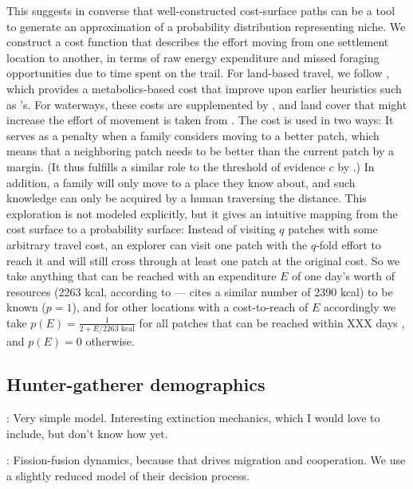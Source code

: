 \documentclass[a4paper,12pt]{scrartcl}
\begin{document}
This suggests in converse that well-constructed cost-surface paths can be a tool
to generate an approximation of a probability distribution representing niche.
We construct a cost function that describes the effort moving from one
settlement location to another, in terms of raw energy expenditure and missed
foraging opportunities due to time spent on the trail. For land-based travel, we
follow \textcite{wood2006energetically}, which provides a metabolics-based cost
that improve upon earlier heuristics such as \textcite{tobler1993three}'s. For
waterways, these costs are supplemented by \textcite{livingood2012no}, and land
cover that might increase the effort of movement is taken from
\cite{white2012geospatial}. The cost is used in two ways: It serves as a penalty
when a family considers moving to a better patch, which means that a neighboring
patch needs to be better than the current patch by a margin. (It thus fulfills a
similar role to the threshold of evidence $c$ by
\textcite{crema2014simulation}.) In addition, a family will only move to a place
they know about, and such knowledge can only be acquired by a human traversing
the distance. This exploration is not modeled explicitly, but it gives an
intuitive mapping from the cost surface to a probability surface: Instead of
visiting $q$ patches with some arbitrary travel cost, an explorer can visit one
patch with the $q$-fold effort to reach it and will still cross through at least
one patch at the original cost. So we take anything that can be reached with an
expenditure $E$ of one day's worth of resources (2263 kcal, according to
\textcite{pontzer2012huntergatherer}---\textcite{smith2003assessment} cites a
similar number of 2390 kcal) to be known ($p=1$), and for other locations with a
cost-to-reach of $E$ accordingly we take $p(E) = \frac{1}{2 + E / {2263
    \text{ kcal}}}$ for all patches that can be reached within XXX days
\parencite{}, and $p(E) = 0$ otherwise.

\subsection{Hunter-gatherer demographics}
\label{s:demographics}

\textcite{hamilton2018stochastic}: Very simple model. Interesting extinction
mechanics, which I would love to include, but don't know how yet.

\textcite{crema2014simulation}: Fission-fusion dynamics, because that drives
migration and cooperation. We use a slightly reduced model of their decision
process.
\end{document}
